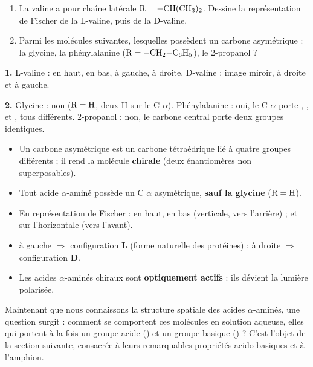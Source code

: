 \documentclass[11pt]{article}
\newcommand{\cle}[1]{{\popxbold\color{popdark}#1}}
\begin{document}
\begin{exercice}
\begin{enumerate}
\item La valine a pour chaîne latérale $\ce{R} = \ce{-CH(CH3)2}$. Dessine la représentation de Fischer de la L-valine, puis de la D-valine.
\item Parmi les molécules suivantes, lesquelles possèdent un carbone asymétrique : la glycine, la phénylalanine ($\ce{R} = \ce{-CH2-C6H5}$), le 2-propanol  ?
\end{enumerate}
\end{exercice}

\begin{corrige}[Exercice]
\textbf{1.} L-valine :  en haut,  en bas,  à gauche,  à droite. D-valine : image miroir,  à droite et  à gauche.
\par\smallskip
\textbf{2.} Glycine : non ($\ce{R} = \ce{H}$, deux H sur le C $\alpha$). Phénylalanine : oui, le C $\alpha$ porte , ,  et , tous différents. 2-propanol : non, le carbone central porte deux groupes  identiques.
\end{corrige}

\begin{aretenir}
\begin{itemize}
\item Un \cle{carbone asymétrique} est un carbone tétraédrique lié à quatre groupes différents ; il rend la molécule \textbf{chirale} (deux énantiomères non superposables).
\item Tout acide $\alpha$-aminé possède un C $\alpha$ asymétrique, \textbf{sauf la glycine} ($\ce{R} = \ce{H}$).
\item En \cle{représentation de Fischer} :  en haut,  en bas (verticale, vers l'arrière) ;  et  sur l'horizontale (vers l'avant).
\item {} à gauche $\Rightarrow$ configuration \textbf{L} (forme naturelle des protéines) ;  à droite $\Rightarrow$ configuration \textbf{D}.
\item Les acides $\alpha$-aminés chiraux sont \textbf{optiquement actifs} : ils dévient la lumière polarisée.
\end{itemize}
\end{aretenir}

Maintenant que nous connaissons la structure spatiale des acides $\alpha$-aminés, une question surgit : comment se comportent ces molécules en solution aqueuse, elles qui portent à la fois un groupe acide () et un groupe basique () ? C'est l'objet de la section suivante, consacrée à leurs remarquables propriétés acido-basiques et à l'amphion.
\end{document}
